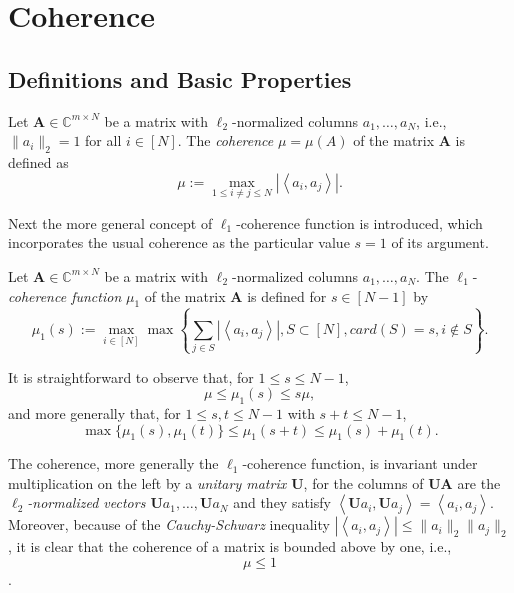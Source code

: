\chapter{Coherence}
\label{coherence}
\section{Definitions and Basic Properties}

\begin{definition}
    \label{def1.1}
    Let $\mathbf{A} \in \mathbb{C}^{m \times N}$ be a matrix with $\ell_2$-normalized columns $a_1,\dots,a_N$, i.e., $\|a_i\|_2=1$ for all $i \in [N]$. The \emph{coherence} $\mu = \mu(A)$ of the matrix $\mathbf{A}$ is defined as
    \begin{equation}
        \mu := \max\limits_{1 \leq i \neq j \leq N} \left|\left<a_i,a_j\right>\right|.
        \label{eq1.1}
    \end{equation}
\end{definition}

Next the more general concept of $\ell_1$-coherence function is introduced, which incorporates the usual coherence as the particular value $s=1$ of its argument.

\begin{definition}
    \label{def1.2}
    Let $\mathbf{A} \in \mathbb{C}^{m \times N}$ be a matrix with $\ell_2$-normalized columns $a_1,\dots,a_N$. The $\ell_1$-\emph{coherence function} $\mu_1$ of the matrix $\mathbf{A}$ is defined for $s \in [N-1]$ by
    \begin{equation*}
        \mu_1(s) := \max\limits_{i \in [N]} \max\left\{\sum\limits_{j \in S}\left|\left<a_i,a_j\right>\right|, S \subset [N], card(S) = s, i \notin S \right\}. 
    \end{equation*}
\end{definition}

It is straightforward to observe that, for $1 \leq s \leq N-1$,
\begin{equation}
    \mu \leq \mu_1(s) \leq s\mu,
    \label{eq1.2}
\end{equation}
and more generally that, for $1 \leq s, t \leq N-1$ with $s+t \leq N-1$,
\begin{equation}
    \max \{\mu_1(s), \mu_1(t)\} \leq \mu_1(s+t) \leq \mu_1(s) + \mu_1(t).
    \label{eq1.3}
\end{equation}

The coherence, more generally the $\ell_1$-coherence function, is invariant under multiplication on the left by a \emph{\textcolor[rgb]{1,0,0}{unitary matrix $\mathbf{U}$}}, for the columns of $\mathbf{UA}$ are the \emph{\textcolor[rgb]{1,0,0}{$\ell_2$-normalized vectors $\mathbf{U}a_1,\dots,\mathbf{U}a_N$}} and they satisfy $\left<\mathbf{U}a_i,\mathbf{U}a_j\right> = \left<a_i,a_j\right>$. Moreover, because of the \emph{Cauchy-Schwarz} inequality $\left|\left<a_i,a_j\right>\right| \leq \|a_i\|_2\|a_j\|_2$, it is clear that the coherence of a matrix is bounded above by one, i.e.,
\[\mu \leq 1\].

